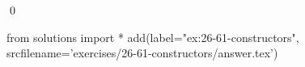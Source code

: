 
\begin{ex}
  \label{ex:26-61-constructors}
  
  \qed
\end{ex}
\begin{python0}
from solutions import *
add(label="ex:26-61-constructors",
    srcfilename='exercises/26-61-constructors/answer.tex')
\end{python0}
